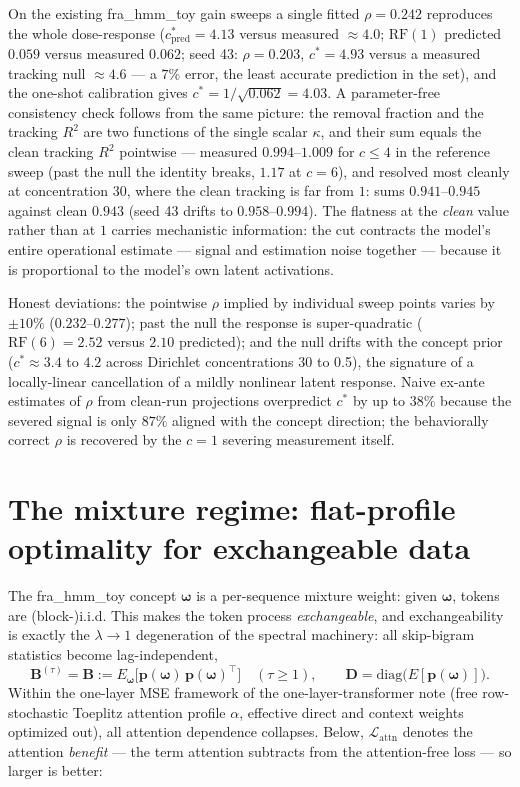 \documentclass{article}
\newcommand{\pb}{\boldsymbol{p}}
\newcommand{\Bb}{\boldsymbol{B}}
\newcommand{\Db}{\boldsymbol{D}}
\newcommand{\omegab}{\boldsymbol{\omega}}
\newcommand{\lattn}{\mathcal{L}_{\text{attn}}}
\newcommand{\Btau}{\Bb^{(\tau)}}
\newcommand{\RF}{\mathrm{RF}}
\theoremstyle{definition}
\begin{document}
On the existing fra\_hmm\_toy gain sweeps a single fitted $\rho = 0.242$
reproduces the whole dose-response ($c^\ast_{\mathrm{pred}} = 4.13$ versus
measured $\approx 4.0$; $\RF(1)$ predicted $0.059$ versus measured $0.062$;
seed 43: $\rho = 0.203$, $c^\ast = 4.93$ versus a measured tracking null
$\approx 4.6$ --- a $7\%$ error, the least accurate prediction in the set), and the
one-shot calibration gives $c^\ast = 1/\sqrt{0.062} = 4.03$. A parameter-free
consistency check follows from the same picture: the removal fraction and
the tracking $R^2$ are two functions of the single scalar $\kappa$, and
their sum equals the clean tracking $R^2$ pointwise --- measured
$0.994$--$1.009$ for $c \le 4$ in the reference sweep (past the null the
identity breaks, $1.17$ at $c=6$), and resolved most cleanly at
concentration 30, where the clean tracking is far from $1$: sums
$0.941$--$0.945$ against clean $0.943$ (seed 43 drifts to $0.958$--$0.994$).
The flatness at the \emph{clean}
value rather than at $1$ carries mechanistic information: the cut contracts
the model's entire operational estimate --- signal and estimation noise
together --- because it is proportional to the model's own latent activations.

Honest deviations: the pointwise $\rho$ implied by individual sweep points
varies by $\pm 10\%$ ($0.232$--$0.277$); past the null the response is
super-quadratic ($\RF(6) = 2.52$ versus $2.10$ predicted); and the null
drifts with the concept prior ($c^\ast \approx 3.4$ to $4.2$ across
Dirichlet concentrations 30 to 0.5), the signature of a locally-linear
cancellation of a mildly nonlinear latent response. Naive ex-ante estimates
of $\rho$ from clean-run projections overpredict $c^\ast$ by up to $38\%$
because the severed signal is only $87\%$ aligned with the concept
direction; the behaviorally correct $\rho$ is recovered by the $c=1$
severing measurement itself.

\section{The mixture regime: flat-profile optimality for exchangeable data}

The fra\_hmm\_toy concept $\omegab$ is a per-sequence mixture weight: given
$\omegab$, tokens are (block-)i.i.d. This makes the token process
\emph{exchangeable}, and exchangeability is exactly the $\lambda \to 1$
degeneration of the spectral machinery: all skip-bigram statistics become
lag-independent,
\begin{equation}
\Btau = \Bb := E_{\omegab}\bigl[\pb(\omegab)\,\pb(\omegab)^\top\bigr]
\quad (\tau \ge 1), \qquad \Db = \mathrm{diag}\bigl(E[\pb(\omegab)]\bigr).
\end{equation}
Within the one-layer MSE framework of the one-layer-transformer note (free
row-stochastic Toeplitz attention profile $\alpha$, effective direct and
context weights optimized out), all attention dependence collapses. Below,
$\lattn$ denotes the attention \emph{benefit} --- the term attention
subtracts from the attention-free loss --- so larger is better:
\end{document}
